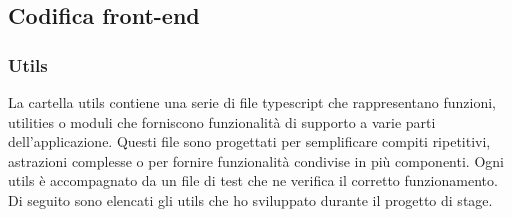 \subsection{Codifica front-end}\label{subsec:codifica-front-end}

\subsubsection{Utils}\label{subsubsec:utils}
La cartella utils contiene una serie di file typescript che rappresentano funzioni, utilities o moduli che forniscono funzionalità di supporto a varie parti dell'applicazione.
Questi file sono progettati per semplificare compiti ripetitivi, astrazioni complesse o per fornire funzionalità condivise in più componenti. Ogni utils è accompagnato 
da un file di test che ne verifica il corretto funzionamento.\\
Di seguito sono elencati gli utils che ho sviluppato durante il progetto di stage.

